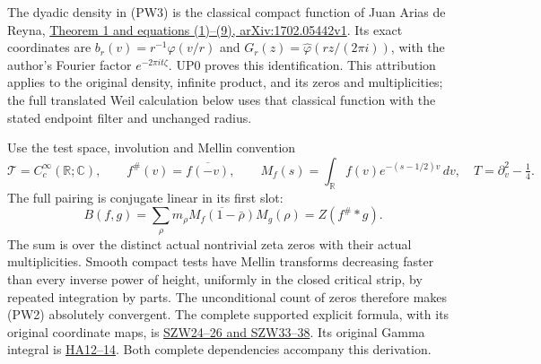 \documentclass[
  10pt,
  a4paper,
]{article}
\begin{document}
The dyadic density in (PW3) is the classical compact function of Juan
Arias de Reyna, \href{https://arxiv.org/abs/1702.05442v1}{Theorem 1 and
equations (1)--(9), arXiv:1702.05442v1}. Its exact coordinates are
\(b_r(v)=r^{-1}\varphi(v/r)\) and
\(G_r(z)=\widehat\varphi(rz/(2\pi i))\), with the author's Fourier
factor \(e^{-2\pi i t\zeta}\). UP0 proves this identification. This
attribution applies to the original density, infinite product, and its
zeros and multiplicities; the full translated Weil calculation below
uses that classical function with the stated endpoint filter and
unchanged radius.

Use the test space, involution and Mellin convention \[
\mathcal T=C_c^\infty(\mathbb R;\mathbb C),\qquad
f^\#(v)=\overline{f(-v)},\qquad
M_f(s)=\int_\mathbb R f(v)e^{-(s-1/2)v}\,dv,
\quad T=\partial_v^2-\tfrac14.
\tag{PW1}
\] The full pairing is conjugate linear in its first slot: \[
 B(f,g)=\sum_\rho m_\rho\overline{M_f(1-\bar\rho)}M_g(\rho)
 =Z(f^\#*g).
\tag{PW2}
\] The sum is over the distinct actual nontrivial zeta zeros with their
actual multiplicities. Smooth compact tests have Mellin transforms
decreasing faster than every inverse power of height, uniformly in the
closed critical strip, by repeated integration by parts. The
unconditional count of zeros therefore makes (PW2) absolutely
convergent. The complete supported explicit formula, with its original
coordinate maps, is
\href{https://github.com/KokunoYumeto/zeta-function-research-reader/blob/76f421965914beb133df797835f940849844dc4f/workbenches/splitzero-tandem/branches/tau-zero-prime-positivity/SUPPORTED_ZERO_PRIME_WEIL_DERIVATION.md}{SZW24--26
and SZW33--38}. Its original Gamma integral is
\href{https://github.com/KokunoYumeto/zeta-function-research-reader/blob/76f421965914beb133df797835f940849844dc4f/workbenches/splitzero-tandem/branches/tau-zero-prime-positivity/HEAT_CAUCHY_ARITHMETIC_DERIVATION.md}{HA12--14}.
Both complete dependencies accompany this derivation.
\end{document}
